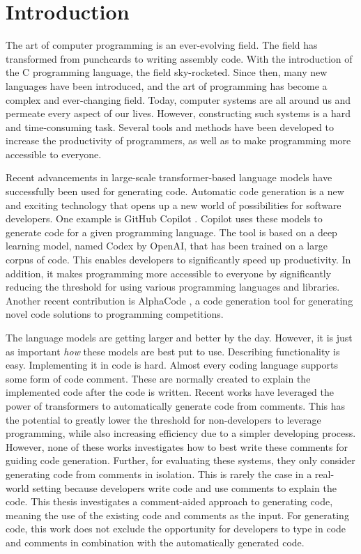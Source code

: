 \chapter{Introduction}
\label{chap:introduction}
The art of computer programming is an ever-evolving field. The field has transformed from punchcards to writing assembly code. With the introduction of the C programming language, the field sky-rocketed. Since then, many new languages have been introduced, and the art of programming has become a complex and ever-changing field. Today, computer systems are all around us and permeate every aspect of our lives. However, constructing such systems is a hard and time-consuming task. Several tools and methods have been developed to increase the productivity of programmers, as well as to make programming more accessible to everyone. 

Recent advancements in large-scale transformer-based language models have successfully been used for generating code. Automatic code generation is a new and exciting technology that opens up a new world of possibilities for software developers. One example is GitHub Copilot \cite{copilot}. Copilot uses these models to generate code for a given programming language. The tool is based on a deep learning model, named Codex \cite{chen2021codex} by OpenAI, that has been trained on a large corpus of code. This enables developers to significantly speed up productivity. In addition, it makes programming more accessible to everyone by significantly reducing the threshold for using various programming languages and libraries. Another recent contribution is AlphaCode \cite{alphacode}, a code generation tool for generating novel code solutions to programming competitions.

The language models are getting larger and better by the day. However, it is just as important \textit{how} these models are best put to use. Describing functionality is easy. Implementing it in code is hard. Almost every coding language supports some form of code comment. These are normally created to explain the implemented code after the code is written. Recent works \cite{chen2021codex,colin2020pymt5} have leveraged the power of transformers to automatically generate code from comments. This has the potential to greatly lower the threshold for non-developers to leverage programming, while also increasing efficiency due to a simpler developing process. However, none of these works investigates how to best write these comments for guiding code generation. Further, for evaluating these systems, they only consider generating code from comments in isolation. This is rarely the case in a real-world setting because developers write code and use comments to explain the code. This thesis investigates a comment-aided approach to generating code, meaning the use of the existing code and comments as the input. For generating code, this work does not exclude the opportunity for developers to type in code and comments in combination with the automatically generated code. 


